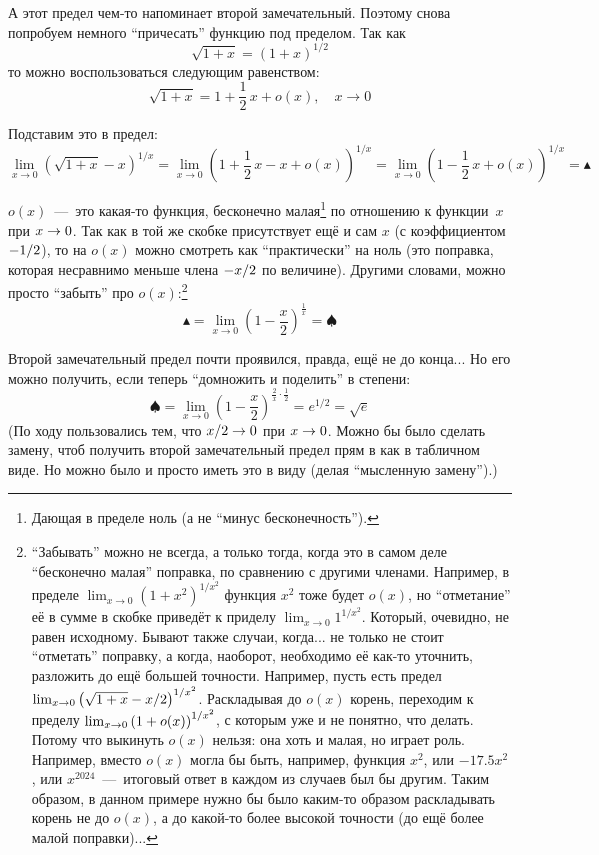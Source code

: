 \documentclass[a4paper,12pt]{article}
\begin{document}
  \begin{solution}
    А этот предел чем-то напоминает второй замечательный.  %
    Поэтому снова попробуем немного ``причесать'' функцию под пределом.
    Так как
    \[
      \sqrt{1 + x} = (1 + x)^{1/2}
    \]
    то можно воспользоваться следующим равенством:
    \[
      \sqrt{1 + x} = 1 + \frac{1}{2}\, x + o(x),\quad x \to 0
    \]

    Подставим это в предел:
    \[
      \lim_{x \to 0} \left(\sqrt{1 + x} - x\right)^{1 / x}
        = \lim_{x \to 0} \left(1 + \frac{1}{2}\, x - x + o(x)\right)^{1 / x}
        = \lim_{x \to 0} \left(1 - \frac{1}{2}\, x + o(x)\right)^{1 / x}
        = \blacktriangle
    \]

    $o(x)$~---~это какая-то функция, бесконечно малая\footnote{
      Дающая в пределе ноль (а не ``минус бесконечность'').
    } по отношению к функции~$x$ при $x \hm\to 0$.
    Так как в той же скобке присутствует ещё и сам $x$ (с коэффициентом $-1\hm/2$), то на $o(x)$ можно смотреть как ``практически'' на ноль (это поправка, которая несравнимо меньше члена $-x\hm/2$ по величине).
    Другими словами, можно просто ``забыть'' про $o(x)$:\footnote{
      ``Забывать'' можно не всегда, а только тогда, когда это в самом деле ``бесконечно малая'' поправка, по сравнению с другими членами. 
      Например, в пределе $\lim_{x \to 0} \left(1 + x^2\right)^{1/x^2}$ функция $x^2$ тоже будет $o(x)$, но ``отметание'' её в сумме в скобке приведёт к приделу $\lim_{x \to 0} 1^{1/x^2}$.
      Который, очевидно, не равен исходному.
      Бывают также случаи, когда... не только не стоит ``отметать'' поправку, а когда, наоборот, необходимо её как-то уточнить, разложить до ещё большей точности.
      Например, пусть есть предел $\lim_{x \to 0} \left(\sqrt{1 + x} \hm- x \hm/ 2\right)^{1/x^2}$.
      Раскладывая до $o(x)$ корень, переходим к пределу $\lim_{x \to 0} \left(1 \hm+ o(x)\right)^{1/x^2}$, с которым уже и не понятно, что делать.
      Потому что выкинуть $o(x)$ нельзя: она хоть и малая, но играет роль.
      Например, вместо $o(x)$ могла бы быть, например, функция $x^2$, или $-17{.}5 x^2$, или $x^{2024}$~---~итоговый ответ в каждом из случаев был бы другим.
      Таким образом, в данном примере нужно бы было каким-то образом раскладывать корень не до $o(x)$, а до какой-то более высокой точности (до ещё более малой поправки)...
    }
    \[
      \blacktriangle = \lim_{x \to 0} \left(1 - \frac{x}{2}\right)^{\frac{1}{x}} = \spadesuit
    \]

    Второй замечательный предел почти проявился, правда, ещё не до конца...
    Но его можно получить, если теперь ``домножить и поделить'' в степени:
    \[
      \spadesuit = \lim_{x \to 0} \left(1 - \frac{x}{2}\right)^{\frac{2}{x} \cdot \frac{1}{2}}
        = e^{1/2} = \sqrt{e}
    \]
    (По ходу пользовались тем, что $x \hm/ 2 \hm\to 0$ при $x \hm\to 0$.
    Можно бы было сделать замену, чтоб получить второй замечательный предел прям в как в табличном виде.
    Но можно было и просто иметь это в виду (делая ``мысленную замену'').)
  \end{solution}
\end{document}

